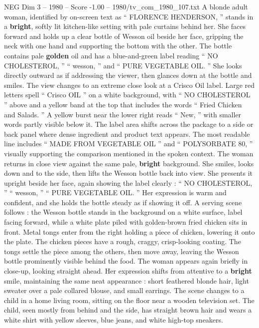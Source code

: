 \begin{textsample}{NEG Dim 3 – 1980 – Score -1.00 – 1980/tv\_com\_1980\_107.txt}  \label{ex:f3_neg_060}
A blonde adult woman, identified by on-screen text as “ FLORENCE HENDERSON, ” stands in a \textbf{bright}, softly lit kitchen-like setting with pale curtains behind her.
She faces forward and holds up a clear bottle of Wesson oil beside her face, gripping the neck with one hand and supporting the bottom with the other.
The bottle contains pale \textbf{golden} oil and has a blue-and-green label reading “ NO CHOLESTEROL, ” “ wesson, ” and “ PURE VEGETABLE OIL. ” She looks directly outward as if addressing the viewer, then glances down at the bottle and smiles.
The view changes to an extreme close look at a Crisco Oil label.
Large red letters spell “ Crisco OIL ” on a white background, with “ NO CHOLESTEROL ” above and a yellow band at the top that includes the words “ Fried Chicken and Salads. ” A yellow burst near the lower right reads “ New, ” with smaller words partly visible below it.
The label area shifts across the package to a side or back panel where dense ingredient and product text appears.
The most readable line includes “ MADE FROM VEGETABLE OIL ” and “ POLYSORBATE 80, ” visually supporting the comparison mentioned in the spoken context.
The woman returns in close view against the same pale, \textbf{bright} background.
She smiles, looks down and to the side, then lifts the Wesson bottle back into view.
She presents it upright beside her face, again showing the label clearly : “ NO CHOLESTEROL, ” “ wesson, ” “ PURE VEGETABLE OIL. ” Her expression is warm and confident, and she holds the bottle steady as if showing it off.
A serving scene follows : the Wesson bottle stands in the background on a white surface, label facing forward, while a white plate piled with golden-brown fried chicken sits in front.
Metal tongs enter from the right holding a piece of chicken, lowering it onto the plate.
The chicken pieces have a rough, craggy, crisp-looking coating.
The tongs settle the piece among the others, then move away, leaving the Wesson bottle prominently visible behind the food.
The woman appears again briefly in close-up, looking straight ahead.
Her expression shifts from attentive to a \textbf{bright} smile, maintaining the same neat appearance : short feathered blonde hair, light sweater over a pale collared blouse, and small earrings.
The scene changes to a child in a home living room, sitting on the floor near a wooden television set.
The child, seen mostly from behind and the side, has straight brown hair and wears a white shirt with yellow sleeves, blue jeans, and white high-top sneakers.

\end{textsample}
